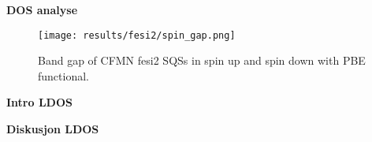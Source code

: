 \begin{comment}
\begin{table}[H]
\centering
\begin{tabular}{@{}cccc@{}}
\toprule
Structure  & Spin-up & Spin-down & Total  \\ \midrule
\textbf{A} & 0.0814  & 0.0522    & 0.0281 \\
\textbf{B} & 0.2932  & 0.0523    & 0.0523 \\
\textbf{C} & 0.2355  & 0.0343    & 0.0343 \\
\textbf{D} & 0.3386  & 0         & 0      \\
\textbf{E} & 0.3078  & 0.0495    & 0.0495 \\ \bottomrule
\end{tabular}
\caption{Band gap (GGA) in spin up and spin down channels of CFMNSi2 structures}
\end{table}

\begin{table}[H]
\centering
\begin{tabular}{@{}cccc@{}}
\toprule
Structure  & PBE    & SCAN   & HSE06  \\ \midrule
\textbf{A} & 0.0281 & 0.0000 & 0.0207 \\
\textbf{B} & 0.0523 & 0.0890 & 0.1808 \\
\textbf{C} & 0.0344 & 0.0690 & 0.0196 \\
\textbf{D} & 0.0000 & 0.0000 & 0.0000 \\
\textbf{E} & 0.0495 & 0.1048 & 0.0133 \\ \bottomrule
\end{tabular}
\caption{Band gap of $CFMN (FeSi_2)$ SQSs with GGA (PBE), meta-GGA (SCAN) and hybrid-functionals (HSE06). \textbf{Add footnote to explain the uncertainty in these results regarding smearing type and width, and DOS and EIGENVAL}}
\end{table}
\end{comment}

\textbf{DOS analyse}

\begin{figure}[H]
\centering
\texttt{[image: results/fesi2/spin\_gap.png]}
\caption{Band gap of CFMN fesi2 SQSs in spin up and spin down with PBE functional.}
\label{DOS_hse06_B}
\end{figure}

\textbf{Intro LDOS}

\textbf{Diskusjon LDOS}

